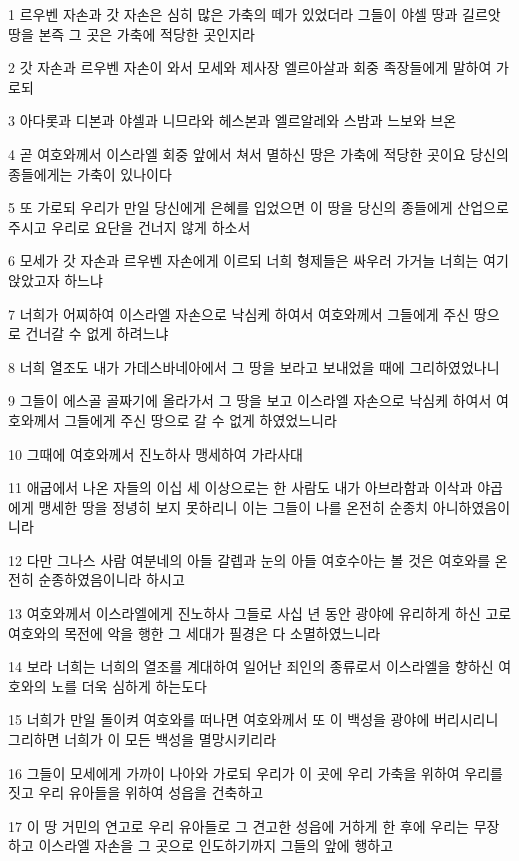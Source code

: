 \par 1 르우벤 자손과 갓 자손은 심히 많은 가축의 떼가 있었더라 그들이 야셀 땅과 길르앗 땅을 본즉 그 곳은 가축에 적당한 곳인지라
\par 2 갓 자손과 르우벤 자손이 와서 모세와 제사장 엘르아살과 회중 족장들에게 말하여 가로되
\par 3 아다롯과 디본과 야셀과 니므라와 헤스본과 엘르알레와 스밤과 느보와 브온
\par 4 곧 여호와께서 이스라엘 회중 앞에서 쳐서 멸하신 땅은 가축에 적당한 곳이요 당신의 종들에게는 가축이 있나이다
\par 5 또 가로되 우리가 만일 당신에게 은혜를 입었으면 이 땅을 당신의 종들에게 산업으로 주시고 우리로 요단을 건너지 않게 하소서
\par 6 모세가 갓 자손과 르우벤 자손에게 이르되 너희 형제들은 싸우러 가거늘 너희는 여기 앉았고자 하느냐
\par 7 너희가 어찌하여 이스라엘 자손으로 낙심케 하여서 여호와께서 그들에게 주신 땅으로 건너갈 수 없게 하려느냐
\par 8 너희 열조도 내가 가데스바네아에서 그 땅을 보라고 보내었을 때에 그리하였었나니
\par 9 그들이 에스골 골짜기에 올라가서 그 땅을 보고 이스라엘 자손으로 낙심케 하여서 여호와께서 그들에게 주신 땅으로 갈 수 없게 하였었느니라
\par 10 그때에 여호와께서 진노하사 맹세하여 가라사대
\par 11 애굽에서 나온 자들의 이십 세 이상으로는 한 사람도 내가 아브라함과 이삭과 야곱에게 맹세한 땅을 정녕히 보지 못하리니 이는 그들이 나를 온전히 순종치 아니하였음이니라
\par 12 다만 그나스 사람 여분네의 아들 갈렙과 눈의 아들 여호수아는 볼 것은 여호와를 온전히 순종하였음이니라 하시고
\par 13 여호와께서 이스라엘에게 진노하사 그들로 사십 년 동안 광야에 유리하게 하신 고로 여호와의 목전에 악을 행한 그 세대가 필경은 다 소멸하였느니라
\par 14 보라 너희는 너희의 열조를 계대하여 일어난 죄인의 종류로서 이스라엘을 향하신 여호와의 노를 더욱 심하게 하는도다
\par 15 너희가 만일 돌이켜 여호와를 떠나면 여호와께서 또 이 백성을 광야에 버리시리니 그리하면 너희가 이 모든 백성을 멸망시키리라
\par 16 그들이 모세에게 가까이 나아와 가로되 우리가 이 곳에 우리 가축을 위하여 우리를 짓고 우리 유아들을 위하여 성읍을 건축하고
\par 17 이 땅 거민의 연고로 우리 유아들로 그 견고한 성읍에 거하게 한 후에 우리는 무장하고 이스라엘 자손을 그 곳으로 인도하기까지 그들의 앞에 행하고

